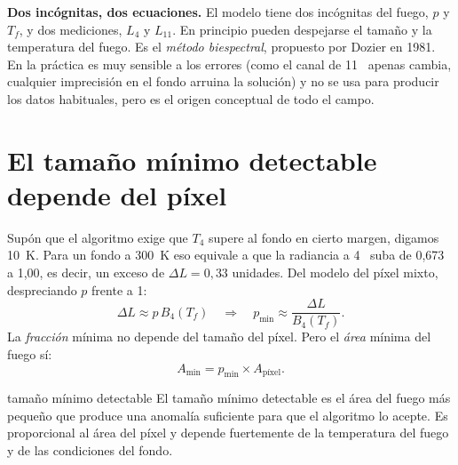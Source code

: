 \textbf{Dos incógnitas, dos ecuaciones.} El modelo tiene dos incógnitas del fuego, $p$ y $T_f$,
y dos mediciones, $L_4$ y $L_{11}$. En principio pueden despejarse el tamaño y la temperatura
del fuego. Es el \emph{método biespectral}, propuesto por Dozier en 1981. En la práctica es muy
sensible a los errores (como el canal de 11~\um{} apenas cambia, cualquier imprecisión en el
fondo arruina la solución) y no se usa para producir los datos habituales, pero es el origen
conceptual de todo el campo.

\section{El tamaño mínimo detectable depende del píxel}

Supón que el algoritmo exige que $T_4$ supere al fondo en cierto margen, digamos 10~K. Para un
fondo a 300~K eso equivale a que la radiancia a 4~\um{} suba de 0,673 a 1,00, es decir, un
exceso de $\Delta L = 0{,}33$ unidades. Del modelo del píxel mixto, despreciando $p$ frente a 1:
\begin{equation}
  \Delta L \approx p\,B_4(T_f)
  \quad\Longrightarrow\quad
  p_{\min} \approx \frac{\Delta L}{B_4(T_f)} .
\end{equation}
La \emph{fracción} mínima no depende del tamaño del píxel. Pero el \emph{área} mínima del fuego
sí:
\begin{equation}\label{eq:amin}
  A_{\min} = p_{\min}\times A_{\text{píxel}} .
\end{equation}

\begin{definicion}{tamaño mínimo detectable}
El tamaño mínimo detectable es el área del fuego más pequeño que produce una anomalía
suficiente para que el algoritmo lo acepte. Es proporcional al área del píxel y depende
fuertemente de la temperatura del fuego y de las condiciones del fondo.
\end{definicion}

